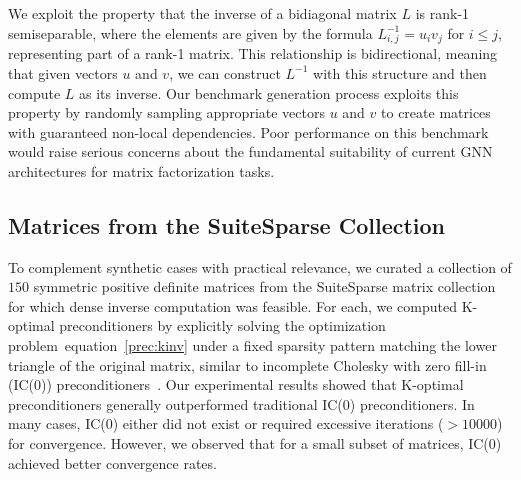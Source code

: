 \documentclass[10pt]{article} %
\def\eqref#1{equation~\ref{#1}}
\theoremstyle{plain}
\theoremstyle{definition}
\theoremstyle{remark}
\begin{document}
We exploit the property that the inverse of a bidiagonal matrix $L$ is rank-1 semiseparable, 
where the elements are given by the formula $L^{-1}_{i,j} = u_i v_j$ for $i \leq j$, representing part of a rank-1 matrix. This relationship is bidirectional, meaning that given vectors $u$ and $v$, we can construct $L^{-1}$ with this structure and then compute $L$ as its inverse. Our benchmark generation process exploits this property by randomly sampling appropriate vectors $u$ and $v$ to create matrices with guaranteed non-local dependencies.
Poor performance on this benchmark would raise serious concerns about the fundamental suitability of current GNN architectures for matrix factorization tasks.

\subsection{Matrices from the SuiteSparse Collection}

To complement synthetic cases with practical relevance, we curated a collection of $150$ symmetric positive definite matrices from the SuiteSparse matrix collection~\citep{suitesparse2024} for which dense inverse computation was feasible.
For each, we computed K-optimal preconditioners by explicitly solving the optimization problem~\eqref{prec:kinv} under a fixed sparsity pattern matching the lower triangle of the original matrix, 
similar to incomplete Cholesky with zero fill-in (IC(0)) preconditioners~\citep{saad2003iterative}. Our experimental results showed that K-optimal preconditioners generally outperformed traditional IC(0) preconditioners. In many cases, IC(0) either did not exist or required excessive iterations ($>10000$) for convergence. However, we observed that for a small subset of matrices, IC(0) achieved better convergence rates.
\end{document}
